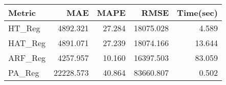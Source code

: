 \begin{tabular}{lrrrr}
\toprule
Metric &       MAE &   MAPE &      RMSE &  Time(sec) \\
\midrule
HT\_Reg  &  4892.321 & 27.284 & 18075.028 &      4.589 \\
HAT\_Reg &  4891.071 & 27.239 & 18074.166 &     13.644 \\
ARF\_Reg &  4257.957 & 10.160 & 16397.503 &     83.059 \\
PA\_Reg  & 22228.573 & 40.864 & 83660.807 &      0.502 \\
\bottomrule
\end{tabular}
